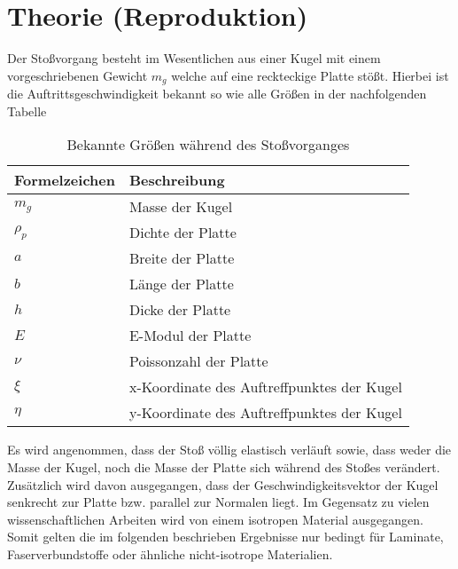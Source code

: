 \chapter{Theorie (Reproduktion)}
\label{chap:Principles}

Der Stoßvorgang besteht im Wesentlichen aus einer Kugel mit einem vorgeschriebenen Gewicht $m_g$ welche auf eine reckteckige Platte stößt. Hierbei ist die Auftrittsgeschwindigkeit bekannt so wie alle Größen in der nachfolgenden Tabelle

\begin{table}[h!]
	\begin{center}
		\caption{Bekannte Größen während des Stoßvorganges}
		\label{tab:TheorieVariablen}
		
		\begin{tabular}[h]{l | l}	
			Formelzeichen & Beschreibung \\
			\hline
			$m_g$ & Masse der Kugel \\
			$\rho_p$ & Dichte der Platte\\
			$a$ & Breite der Platte\\
			$b$ & Länge der Platte\\
			$h$ & Dicke der Platte \\
			$E$ & E-Modul der Platte \\
			$\nu$ & Poissonzahl der Platte \\
			$\xi$ & x-Koordinate des Auftreffpunktes der Kugel \\
			$\eta$ & y-Koordinate des Auftreffpunktes der Kugel \\
		\end{tabular}
		
	\end{center}
\end{table}


Es wird angenommen, dass der Stoß völlig elastisch verläuft sowie, dass weder die Masse der Kugel, noch die Masse der Platte sich während des Stoßes verändert.
Zusätzlich wird davon ausgegangen, dass der Geschwindigkeitsvektor der Kugel senkrecht zur Platte bzw. parallel zur Normalen liegt. Im Gegensatz zu vielen wissenschaftlichen Arbeiten wird von einem isotropen Material ausgegangen. Somit gelten die im folgenden beschrieben Ergebnisse nur bedingt für Laminate, Faserverbundstoffe oder ähnliche nicht-isotrope Materialien. 

